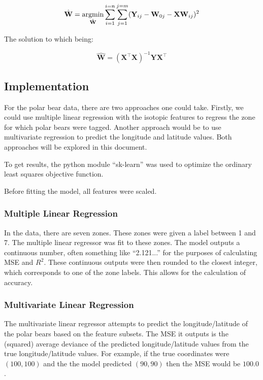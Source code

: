 \documentclass[a4paper,english]{article}
\newcommand{\argmin}{\operatornamewithlimits{argmin}}
\begin{document}
$$
\hat{\textbf{W}} = \argmin_{\hat{\textbf{W}}}\sum_{i=1}^{i=n}\sum_{j=1}^{j=m}(\textbf{Y}_{ij} - \textbf{W}_{0j} - \textbf{XW}_{ij})^2
$$

The solution to which being:

$$
\hat{\textbf{W}} = (\textbf{X}^{\intercal}\textbf{X})^{-1}\textbf{Y}\textbf{X}^{\intercal}
$$

\subsection{Implementation}

For the polar bear data, there are two approaches one could take. Firstly, we could use multiple linear regression with the isotopic features to regress the zone for which polar bears were tagged. Another approach would be to use multivariate regression to predict the longitude and latitude values. Both approaches will be explored in this document.

To get results, the python module ``sk-learn'' was used to optimize the ordinary least squares objective function. 

Before fitting the model, all features were scaled. 

\subsubsection{Multiple Linear Regression}

In the data, there are seven zones. These zones were given a label between 1 and 7. The multiple linear regressor was fit to these zones. The model outputs a continuous number, often something like ``2.121...'' for the purposes of calculating MSE and $R^2$. These continuous outputs were then rounded to the closest integer, which corresponds to one of the zone labels. This allows for the calculation of accuracy. 

\subsubsection{Multivariate Linear Regression}


The multivariate linear regressor attempts to predict the longitude/latitude of the polar bears based on the feature subsets. The MSE it outputs is the (squared) average deviance of the predicted longitude/latitude values from the true longitude/latitude values. For example, if the true coordinates were $(100,100)$ and the the model predicted $(90,90)$ then the MSE would be $100.0$.
\end{document}
